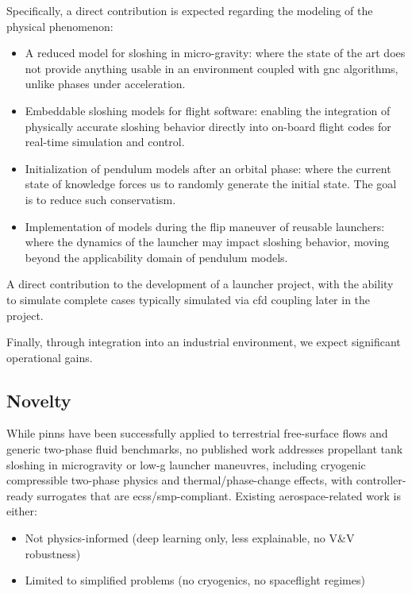 \documentclass[12pt]{article}
\begin{document}
	Specifically, a direct contribution is expected regarding the modeling of the physical phenomenon:
	\begin{itemize}
		\item A reduced model for sloshing in micro-gravity: where the state of the art does not provide anything usable in an environment coupled with \acrshort{gnc} algorithms, unlike phases under acceleration.
		\item Embeddable sloshing models for flight software: enabling the integration of physically accurate sloshing behavior directly into on-board flight codes for real-time simulation and control.
		\item Initialization of pendulum models after an orbital phase: where the current state of knowledge forces us to randomly generate the initial state. The goal is to reduce such conservatism.
		\item Implementation of models during the flip maneuver of reusable launchers: where the dynamics of the launcher may impact sloshing behavior, moving beyond the applicability domain of pendulum models.
	\end{itemize}
	A direct contribution to the development of a launcher project, with the ability to simulate complete cases typically simulated via \acrshort{cfd} coupling later in the project.
	
	Finally, through integration into an industrial environment, we expect significant operational gains.
	
	\subsection*{Novelty}
	
	While \gls{pinn}s have been successfully applied to terrestrial free-surface flows and generic two-phase fluid benchmarks, no published work addresses propellant tank sloshing in microgravity or low-g launcher maneuvres, including cryogenic compressible two-phase physics and thermal/phase-change effects, with controller-ready surrogates that are \acrshort{ecss}/\acrshort{smp}-compliant.
	Existing aerospace-related work is either:
	
	\begin{itemize}
		\item Not physics-informed (deep learning only, less explainable, no V\&V robustness)
		\item Limited to simplified problems (no cryogenics, no spaceflight regimes)
	\end{itemize}
	
\end{document}
